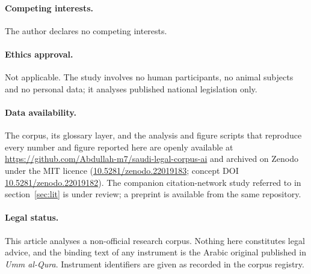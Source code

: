 \documentclass[11pt]{article}
\begin{document}
\paragraph{Competing interests.} The author declares no competing interests.

\paragraph{Ethics approval.} Not applicable. The study involves no human
participants, no animal subjects and no personal data; it analyses published
national legislation only.

\paragraph{Data availability.} The corpus, its glossary layer, and the
analysis and figure scripts that reproduce every number and figure reported
here are openly available at
\url{https://github.com/Abdullah-m7/saudi-legal-corpus-ai} and archived on
Zenodo under the MIT licence
(\href{https://doi.org/10.5281/zenodo.22019183}{10.5281/zenodo.22019183};
concept DOI
\href{https://doi.org/10.5281/zenodo.22019182}{10.5281/zenodo.22019182}).
The companion citation-network study referred to in section~\ref{sec:lit} is under
review; a preprint is available from the same repository.

\paragraph{Legal status.} This article analyses a non-official research
corpus. Nothing here constitutes legal advice, and the binding text of any
instrument is the Arabic original published in \emph{Umm al-Qura}.
Instrument identifiers are given as recorded in the corpus registry.
\fi
\end{document}

